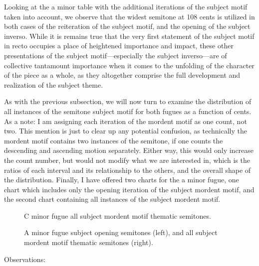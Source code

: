     Looking at the a minor table with the additional iterations of the
subject motif taken into account, we observe that the widest semitone at
108 cents is utilized in both cases of the reiteration of the subject
motif, and the opening of the subject inverso. While it is remains true
that the very first statement of the subject motif in recto occupies a
place of heightened importance and impact, these other presentations of
the subject motif---especially the subject inverso---are of
collective tantamount importance when it comes to the unfolding of the
character of the piece as a whole, as they altogether comprise the full
development and realization of the subject theme.

As with the previous subsection, we will now turn to examine the
distribution of all instances of the semitone subject motif for both
fugues as a function of cents. As a note: I am assigning each iteration
of the mordent motif as one count, not two. This mention is just to
clear up any potential confusion, as technically the mordent motif
contains two instances of the semitone, if one counts the descending and
ascending motion separately. Either way, this would only increase the
count number, but would not modify what we are interested in, which is
the ratios of each interval and its relationship to the others, and the
overall shape of the distribution. Finally, I have offered two charts
for the a minor fugue, one chart which includes only the opening
iteration of the subject mordent motif, and the second chart containing
all instances of the subject mordent motif.




\begin{figure}[H]
\vspace{1.5em}
    \centering
    \caption{C minor fugue all subject mordent motif thematic semitones. }
\end{figure}

\begin{figure}[H]
\vspace{1.5em}
    \centering
    \caption[A minor fugue subject opening semitones, and all subject mordent motif thematic semitones. ]{A minor fugue subject opening semitones (left), and all subject mordent motif thematic semitones (right).}
\end{figure}    Observations:

